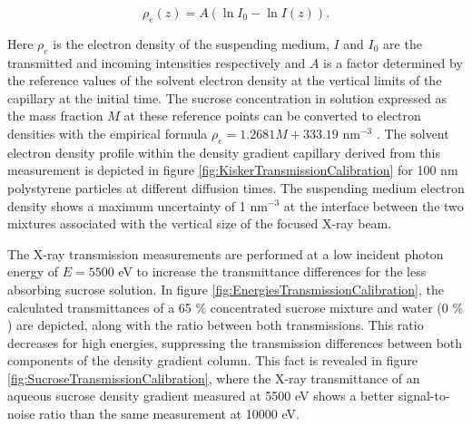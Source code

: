 \begin{equation}
  \rho_e(z) = A \left( \ln{I_0} - \ln{I(z)} \right) .
\end{equation}

Here \(\rho_e\) is the electron density of the suspending medium, $I$ and $I_0$ are the transmitted and incoming intensities respectively and $A$ is a factor determined by the reference values of the solvent electron density at the vertical limits of the capillary at the initial time. The sucrose concentration in solution expressed as the mass fraction \( M \) at these reference points can be converted to electron densities with the empirical formula \( \rho_e=1.2681M+333.19 \) nm\(^{-3}\) \citep{haynes_crc_2012}. The solvent electron density profile within the density gradient capillary derived from this measurement is depicted in figure \ref{fig:KiskerTransmissionCalibration} for 100 nm polystyrene particles at different diffusion times. The suspending medium electron density shows a maximum uncertainty of 1 nm$^{-3}$ at the interface between the two mixtures associated with the vertical size of the focused X-ray beam.

\begin{figure*}%
	\centering
		
		\caption[Calibration of the solvent electron density by X-ray transmission.]{Solvent density along the gradient capillary vertical axis at different diffusion times, calculated from the transmission measurements at 5500 eV \textcolor{red}{of 100 nm polystyrene particles}. The corresponding X-ray transmission is shown on the right axis, revealing the low transmittances of the filled capillary at low energies.}
		\label{fig:KiskerTransmissionCalibration}
\end{figure*}

The X-ray transmission measurements are performed at a low incident photon energy of $E = 5500$ eV to increase the transmittance differences for the less absorbing sucrose solution. In figure \ref{fig:EnergiesTransmissionCalibration}, the calculated transmittances of a 65 $\%$ concentrated sucrose mixture and water (0 $\%$) are depicted, along with the ratio between both transmissions. This ratio decreases for high energies, suppressing the transmission differences between both components of the density gradient column. This fact is revealed in figure \ref{fig:SucroseTransmissionCalibration}, where the X-ray transmittance of an aqueous sucrose density gradient measured at 5500 eV shows a better signal-to-noise ratio than the same measurement at 10000 eV.

